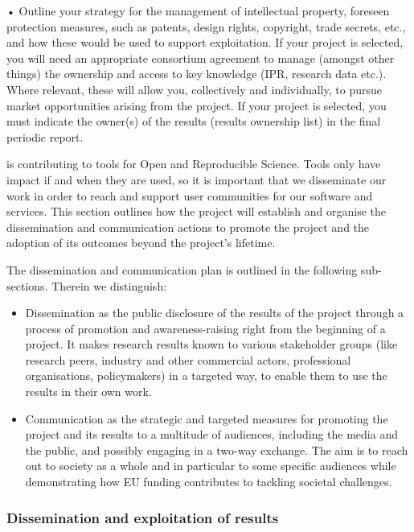 {•	Outline your strategy for the management of intellectual property, foreseen protection measures, such as patents, design rights, copyright, trade secrets, etc., and how these would be used to support exploitation.
	If your project is selected, you will need an appropriate consortium agreement to manage (amongst other things) the ownership and access to key knowledge (IPR, research data etc.). Where relevant, these will allow you, collectively and individually, to pursue market opportunities arising from the project.
	If your project is selected, you must indicate the owner(s) of the results (results ownership list) in the final periodic report.
}

\TheProject is contributing to tools for Open and Reproducible Science.
Tools only have impact if and when they are used,
so it is important that we disseminate our work
in order to reach and support user communities for our software and services. This section
outlines how the project will establish and organise the dissemination and communication
actions to promote the project and the adoption of its outcomes beyond the project's lifetime.

The dissemination and communication plan is outlined in the following sub-sections.
Therein we distinguish:
\begin{itemize}
\item Dissemination as the public disclosure of the results of the project through
a process of promotion and awareness-raising right from the beginning of a project.
It makes research results known to various stakeholder groups (like research peers, industry
and other commercial actors, professional organisations, policymakers) in a targeted
way, to enable them to use the results in their own work.
\item Communication as the strategic and targeted measures for promoting the project
and its results to a multitude of audiences, including the media and the public, and possibly
engaging in a two-way exchange. The aim is to reach out to society as a whole and
in particular to some specific audiences while demonstrating how EU funding contributes to tackling
societal challenges.
\end{itemize}

\subsubsection{Dissemination and exploitation of results}

